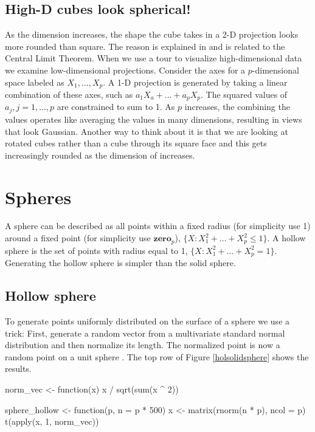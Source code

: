\subsection{High-D cubes look spherical!}

As the dimension increases, the shape the cube takes in a 2-D
projection looks more rounded than square. The reason is explained in
\citet{DF84} and is related to the Central Limit Theorem. When we use
a tour to visualize high-dimensional data we examine low-dimensional
projections.  Consider the axes for a $p$-dimensional space labeled as
$X_1, ..., X_p$. A 1-D projection is generated by taking a linear
combination of these axes, such as $a_1X_a+...+a_pX_p$. The squared
values of $a_j, j=1, ..., p$ are constrained to sum to 1. As $p$
increases, the combining the values operates like averaging the values
in many dimensions, resulting in views that look Gaussian. Another way
to think about it is that we are looking at rotated cubes rather than
a cube through its square face and this gets increasingly rounded as
the dimension of increases.


\section{Spheres}

A sphere can be described as all
points within a fixed radius (for simplicity use 1) around a fixed point (for simplicity use {$\mathbf{zero}_p$}), $\{X: X_1^2+\dots + X_p^2 \leq 1\}$.  A hollow sphere is the set of points with radius equal to 1, $\{X: X_1^2+\dots + X_p^2 = 1\}$. Generating the hollow sphere is simpler than the solid sphere.

\subsection{Hollow sphere}

To generate points uniformly distributed on the surface of a sphere we
use a trick: First, generate a random vector from a multivariate
standard normal distribution and then normalize its length. The normalized point is now a random point on a unit sphere \citep[2.6]{StatSphere}. The top
row of Figure \ref{holsolidsphere} shows the results.

\begin{example}
norm_vec <- function(x) {
  x / sqrt(sum(x ^ 2))
}

sphere_hollow <- function(p, n = p * 500) {
  x <- matrix(rnorm(n * p), ncol = p)
  t(apply(x, 1, norm_vec))
}
\end{example}

